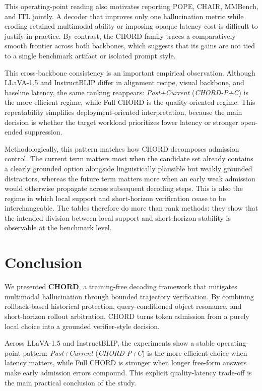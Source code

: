 \documentclass[sigconf,anonymous]{acmart}
\begin{document}
This operating-point reading also motivates reporting POPE, CHAIR, MMBench, and ITL jointly. A decoder that improves only one hallucination metric while eroding retained multimodal ability or imposing opaque latency cost is difficult to justify in practice. By contrast, the CHORD family traces a comparatively smooth frontier across both backbones, which suggests that its gains are not tied to a single benchmark artifact or isolated prompt style.

This cross-backbone consistency is an important empirical observation. Although LLaVA-1.5 and InstructBLIP differ in alignment recipe, visual backbone, and baseline latency, the same ranking reappears: \textit{Past+Current} (\textit{CHORD-P+C}) is the more efficient regime, while Full CHORD is the quality-oriented regime. This repeatability simplifies deployment-oriented interpretation, because the main decision is whether the target workload prioritizes lower latency or stronger open-ended suppression.

Methodologically, this pattern matches how CHORD decomposes admission control. The current term matters most when the candidate set already contains a clearly grounded option alongside linguistically plausible but weakly grounded distractors, whereas the future term matters more when an early weak admission would otherwise propagate across subsequent decoding steps. This is also the regime in which local support and short-horizon verification cease to be interchangeable. The tables therefore do more than rank methods: they show that the intended division between local support and short-horizon stability is observable at the benchmark level.

\section{Conclusion}
\label{sec:conclusion}

We presented \textbf{CHORD}, a training-free decoding framework that mitigates multimodal hallucination through bounded trajectory verification. By combining rollback-based historical protection, query-conditioned object resonance, and short-horizon rollout arbitration, CHORD turns token admission from a purely local choice into a grounded verifier-style decision.

Across LLaVA-1.5 and InstructBLIP, the experiments show a stable operating-point pattern: \textit{Past+Current} (\textit{CHORD-P+C}) is the more efficient choice when latency matters, while Full CHORD is stronger when longer free-form answers make early admission errors compound. This explicit quality-latency trade-off is the main practical conclusion of the study.
\end{document}
